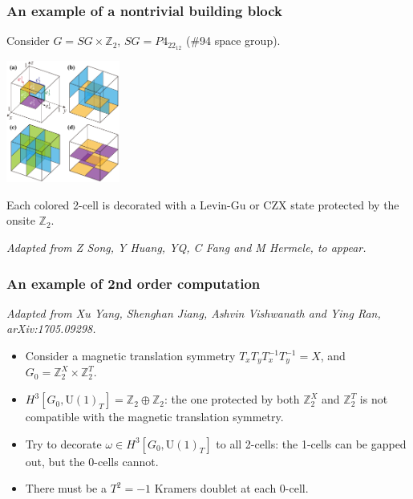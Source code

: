 \documentclass[xcolor=table, 10pt, aspectratio=43]{beamer}
\newcommand{\uone}{\mathrm U(1)}
\begin{document}
\begin{frame}
\frametitle{An example of a nontrivial building block}
Consider $G=SG\times\mathbb Z_2$, $SG=P4_22_12$ (\#94 space group).
\begin{center}
\includegraphics[height=4cm]{blocks}
\end{center}
Each colored 2-cell is decorated with a Levin-Gu or CZX state protected by the onsite $\mathbb Z_2$.

\emph{\small Adapted from Z Song, Y Huang, YQ, C Fang and M Hermele, to appear.}
\end{frame}

\begin{frame}
\frametitle{An example of 2nd order computation}
\emph{\small Adapted from Xu Yang, Shenghan Jiang, Ashvin Vishwanath and Ying Ran, arXiv:1705.09298.}
\begin{itemize}
	\item Consider a magnetic translation symmetry $T_xT_yT_x^{-1}T_y^{-1} = X$, and $G_0=\mathbb Z_2^X\times\mathbb Z_2^T$.
	\item $H^3[G_0,\uone_T]=\mathbb Z_2\oplus\mathbb Z_2$: the one protected by both $\mathbb Z_2^X$ and $\mathbb Z_2^T$ is \alert{not compatible} with the magnetic translation symmetry.
	\item Try to decorate $\omega\in H^3[G_0,\uone_T]$ to all 2-cells: the 1-cells can be gapped out, but the 0-cells \alert{cannot}.
	\item There must be a $T^2=-1$ Kramers doublet at each 0-cell.
\end{itemize}
\begin{center}
\end{center}
\end{frame}
\end{document}
